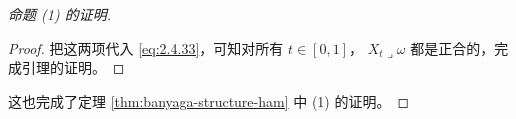 \begin{proof}[命题 (1) 的证明]
\begin{proof}
把这两项代入 \eqref{eq:2.4.33}，可知对所有 $t\in[0,1]$，
$X_t\mathbin{\lrcorner}\omega$ 都是正合的，完成引理的证明。
\end{proof}

这也完成了定理 \ref{thm:banyaga-structure-ham} 中 (1) 的证明。
\end{proof}
